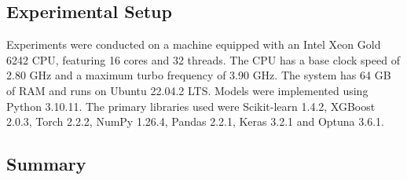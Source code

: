 \subsection{Experimental Setup}
Experiments were conducted on a machine equipped with an Intel Xeon Gold 6242 CPU, featuring 16 cores and 32 threads.
The CPU has a base clock speed of 2.80 GHz and a maximum turbo frequency of 3.90 GHz.
The system has 64 GB of RAM and runs on Ubuntu 22.04.2 LTS.
Models were implemented using Python 3.10.11.
The primary libraries used were Scikit-learn 1.4.2, XGBoost 2.0.3, Torch 2.2.2, NumPy 1.26.4, Pandas 2.2.1, Keras 3.2.1 and Optuna 3.6.1.



\subsection{Summary}
